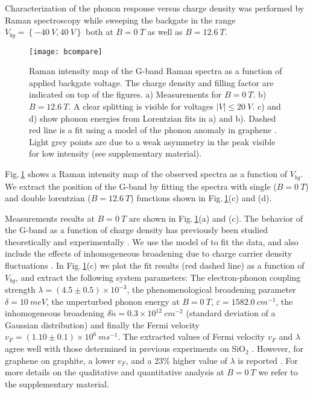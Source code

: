 \documentclass[prl,aps,superscriptaddress,showpacs,reprint]{revtex4-1}
\begin{document}
Characterization of the phonon response versus charge density was performed by Raman spectroscopy while sweeping the backgate in the range $V_{bg}=\left\lbrace -40\: V,40\: V \right\rbrace$ both at $B=0\: T$ as well as $B=12.6\: T$.
\begin{figure}[!hb]
\texttt{[image: bcompare]}
\caption{\label{bcompare}
Raman intensity map of the G-band Raman spectra as a function of applied backgate voltage. The charge density and filling factor are indicated on top of the figures. a) Measurements for $B=0\: T$. b) $B=12.6\: T$. A clear splitting is visible for voltages $\left|V\right|\leq 20\: V$. c) and d)  show phonon energies from Lorentzian fits in a) and b). Dashed red line is a fit using a model of the phonon anomaly in graphene \cite{tsuneya2006anomaly}. Light grey points are due to a weak asymmetry in the peak visible for  low intensity (see supplementary material). }
\end{figure}
Fig.\,\ref{bcompare} shows a Raman intensity map of the observed spectra as a function of $V_{bg}$. We extract the position of the G-band by fitting the spectra with single ($B=0\: T$) and double lorentzian ($B=12.6\: T$) functions shown in Fig.\,\ref{bcompare}(c) and (d).

Measurements results at $B=0\: T$ are shown in Fig.\,\ref{bcompare}(a) and (c).
The behavior of the G-band  as a function of charge density has previously been studied theoretically and experimentally \cite{pisana2007breakdown,yan2007electric,stampfer2007raman,tsuneya2006anomaly}.  We use the model of \cite{tsuneya2006anomaly} to fit the data, and also include the effects of inhomogeneous broadening due to charge carrier density fluctuations \cite{yan2007electric}. In Fig.\,\ref{bcompare}(c) we plot the fit results (red dashed line) as a function of $V_{bg}$, and extract the following system parameters: The electron-phonon coupling strength $\lambda = (4.5\pm 0.5)\times 10^{-3}$, the phenomenological broadening parameter \cite{tsuneya2006anomaly} $\delta=10\:  meV$, the unperturbed phonon energy at $B=0\: T$, $\varepsilon=1582.0\: cm^{-1}$, the inhomogeneous broadening $\delta \widetilde{n}=0.3\times 10^{12}\: cm^{-2}$ (standard deviation of a Gaussian distribution) and finally the Fermi velocity $v_F=(1.10\pm 0.1)\times 10^6\: ms^{-1}$. The extracted values of Fermi velocity $v_F$ and $\lambda$ agree well with those determined in previous experiments on SiO$_2$ \cite{PhysRevLett.110.227402,kossacki2012circular}. However, for graphene on graphite, a lower $v_F$,  and a $23\%$ higher value of  $\lambda$ is reported \cite{yan2010observation}. For more details on the qualitative and quantitative analysis at $B=0\: T$ we refer to the supplementary material.
\end{document}
